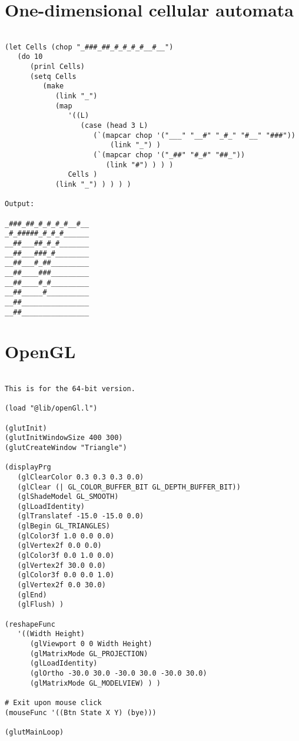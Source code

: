 \section*{One-dimensional cellular automata}

\begin{verbatim}

(let Cells (chop "_###_##_#_#_#_#__#__")
   (do 10
      (prinl Cells)
      (setq Cells
         (make
            (link "_")
            (map
               '((L)
                  (case (head 3 L)
                     (`(mapcar chop '("___" "__#" "_#_" "#__" "###"))
                         (link "_") )
                     (`(mapcar chop '("_##" "#_#" "##_"))
                        (link "#") ) ) )
               Cells )
            (link "_") ) ) ) )

Output:

_###_##_#_#_#_#__#__
_#_#####_#_#_#______
__##___##_#_#_______
__##___###_#________
__##___#_##_________
__##____###_________
__##____#_#_________
__##_____#__________
__##________________
__##________________

\end{verbatim}

\section*{OpenGL}

\begin{verbatim}

This is for the 64-bit version.

(load "@lib/openGl.l")

(glutInit)
(glutInitWindowSize 400 300)
(glutCreateWindow "Triangle")

(displayPrg
   (glClearColor 0.3 0.3 0.3 0.0)
   (glClear (| GL_COLOR_BUFFER_BIT GL_DEPTH_BUFFER_BIT))
   (glShadeModel GL_SMOOTH)
   (glLoadIdentity)
   (glTranslatef -15.0 -15.0 0.0)
   (glBegin GL_TRIANGLES)
   (glColor3f 1.0 0.0 0.0)
   (glVertex2f 0.0 0.0)
   (glColor3f 0.0 1.0 0.0)
   (glVertex2f 30.0 0.0)
   (glColor3f 0.0 0.0 1.0)
   (glVertex2f 0.0 30.0)
   (glEnd)
   (glFlush) )

(reshapeFunc
   '((Width Height)
      (glViewport 0 0 Width Height)
      (glMatrixMode GL_PROJECTION)
      (glLoadIdentity)
      (glOrtho -30.0 30.0 -30.0 30.0 -30.0 30.0)
      (glMatrixMode GL_MODELVIEW) ) )

# Exit upon mouse click
(mouseFunc '((Btn State X Y) (bye)))

(glutMainLoop)

\end{verbatim}


